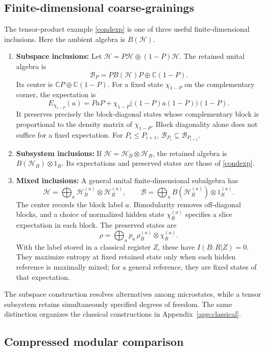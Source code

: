 \documentclass[a4paper,11pt]{article}
\theoremstyle{definition}
\begin{document}
\subsection{Finite-dimensional coarse-grainings}\label{app:finite-coarse}

The tensor-product example \eqref{condexp} is one of three useful finite-dimensional
inclusions. Here the ambient algebra is $B(\mathcal H)$.
\begin{enumerate}
 \item {\bf Subspace inclusions:} Let $\mathcal H=P\mathcal H\oplus(1-P)\mathcal H$.
 The retained unital algebra is
 \[
  \mathcal B_P=P B(\mathcal H)P\oplus\mathbb C(1-P).
 \]
 Its center is $\mathbb CP\oplus\mathbb C(1-P)$. For a fixed state $\chi_{1-P}$
 on the complementary corner, the expectation is
 \[
  E_{\chi_{1-P}}(a)=PaP+
  \chi_{1-P}\bigl((1-P)a(1-P)\bigr)(1-P).
 \]
 It preserves precisely the block-diagonal states whose complementary block
 is proportional to the density matrix of $\chi_{1-P}$.
 Block diagonality alone does not suffice for a fixed expectation.
 For $P_i\leq P_{i+1}$, $\mathcal B_{P_i}\subseteq\mathcal B_{P_{i+1}}$.
 \item {\bf Subsystem inclusions:} If $\mathcal H=\mathcal H_B\otimes\mathcal H_R$,
 the retained algebra is $B(\mathcal H_B)\otimes1_R$.
 Its expectations and preserved states are those of \eqref{condexp}.
 \item {\bf Mixed inclusions:} A general unital finite-dimensional subalgebra has
 \[
  \mathcal H=\bigoplus_a\mathcal H_B^{(a)}\otimes\mathcal H_R^{(a)},\qquad
  \mathcal B=\bigoplus_a B(\mathcal H_B^{(a)})\otimes1_R^{(a)}.
 \]
 The center records the block label $a$. Bimodularity removes off-diagonal blocks,
 and a choice of normalized hidden state $\chi_R^{(a)}$ specifies a slice
 expectation in each block. The preserved states are
 \[
  \rho=\bigoplus_a p_a\,\rho_B^{(a)}\otimes\chi_R^{(a)}.
 \]
 With the label stored in a classical register $Z$, these have $I(B:R|Z)=0$.
 They maximize entropy at fixed retained state only when each hidden reference
 is maximally mixed; for a general reference, they are fixed states of that expectation.
\end{enumerate}
The subspace construction resolves alternatives among microstates, while a tensor
subsystem retains simultaneously specified degrees of freedom. The same distinction
organizes the classical constructions in Appendix~\ref{app:classical}.

\subsection{Compressed modular comparison}\label{app:compressed-comparison}
\end{document}
